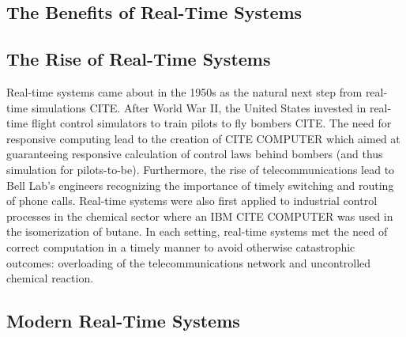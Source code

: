 \subsection{The Benefits of Real-Time Systems}



\subsection{The Rise of Real-Time Systems}


Real-time systems came about in the 1950s as the natural next step from real-time simulations CITE.
After World War II, the United States invested in real-time flight control simulators to train pilots to fly bombers CITE.
The need for responsive computing lead to the creation of CITE COMPUTER which aimed at guaranteeing responsive calculation of control laws behind bombers (and thus simulation for pilots-to-be).
Furthermore, the rise of telecommunications lead to Bell Lab's engineers recognizing the importance of timely switching and routing of phone calls.
Real-time systems were also first applied to industrial control processes in the chemical sector where an IBM CITE COMPUTER was used in the isomerization of butane.
In each setting, real-time systems met the need of correct computation in a timely manner to avoid otherwise catastrophic outcomes: overloading of the telecommunications network and uncontrolled chemical reaction.

\subsection{Modern Real-Time Systems}


